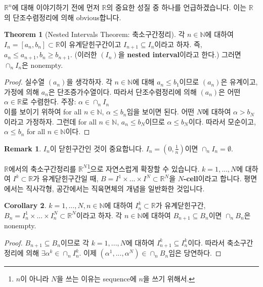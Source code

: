 \documentclass[12pt]{article}
\theoremstyle{definition}
\newtheorem{thm}{Theorem}[section]
\newtheorem{cor}[thm]{Corollary}
\newtheorem*{rem}{Remark}
\def\NN{\mathbb{N}}
\def\RR{\mathbb{R}}
\begin{document}
\(\RR^n\)에 대해 이야기하기 전에 먼저 \(\RR\)의 중요한 성질 중 하나를 언급하겠습니다. 이는 \(\RR\)의 단조수렴정리에 의해 obvious합니다.

	\begin{thm}[Nested Intervals Theorem: 축소구간정리]
		각 \(n \in \NN\)에 대하여 \(I_n = [a_n, b_n] \subset \RR\)이 유계닫힌구간이고 \(I_{n+1} \subseteq I_n\)이라고 하자. 즉, \(a_n \le a_{n+1}, b_n \ge b_{n+1}\). (이러한 \((I_n)\)을 \textbf{nested interval}이라고 한다.) 그러면 \(\cap_n I_n\)은 nonempty.
	\end{thm}
	\begin{proof}
		실수열 \((a_n)\)을 생각하자. 각 \(n \in \mathbb{N}\)에 대해 \(a_n \le b_1\)이므로 \((a_n)\)은 유계이고, 가정에 의해 \(a_n\)은 단조증가수열이다. 따라서 단조수렴정리에 의해 \((a_n)\)은 어떤 \(\alpha \in \RR\)로 수렴한다. 주장: \(\alpha \in \cap_n I_n\)\\
		이를 보이기 위하여 for all \(n \in \NN\), \(\alpha \le b_n\)임을 보이면 된다. 어떤 \(N\)에 대하여 \(\alpha > b_N\)이라고 가정하자. 그런데 for all \(n \in \NN\), \(a_n \le b_N\)이므로 \(\alpha \le b_N\)이다. 따라서 모순이고, \(\alpha \le b_n\) for all \(n \in \NN\)이다.
	\end{proof}

	\begin{rem}
		\(I_n\)이 닫힌구간인 것이 중요합니다. \(I_n = (0, \frac{1}{n})\)이면 \(\cap_n I_n = \emptyset \).
	\end{rem}

\(\RR\)에서의 축소구간정리를 \(\RR^N\)\footnote{\(n\)이 아니라 \(N\)을 쓰는 이유는 sequence에 \(n\)을 쓰기 위해서.}으로 자연스럽게 확장할 수 있습니다. \(k = 1, ..., N\)에 대하여 \(I^k \subset \RR\)가 유계닫힌구간일 때, \(B = I^1 \times ... \times I^N \subset \RR^N\)을 \textbf{\(N\)-cell}이라고 합니다. 평면에서는 직사각형, 공간에서는 직육면체의 개념을 일반화한 것입니다.

	\begin{cor} \label{cor Ncell}
		\(k = 1, ..., N, n \in \NN\)에 대하여 \(I_n^k \subset \RR\)가 유계닫힌구간, \(B_n = I_n^1 \times ... \times I_n^N \subset \RR^N\)이라고 하자. 각 \(n \in \NN\)에 대하여 \(B_{n+1} \subseteq B_n\)이면 \(\cap_n B_n\)은 nonempty.
	\end{cor}
	\begin{proof}
		\(B_{n+1} \subseteq B_n\)이므로 각 \(k = 1, ..., N\)에 대하여 \(I_{n+1}^k \subseteq I_n^k\)이다. 따라서 축소구간정리에 의해 \(\exists \alpha^k \in \cap_n I_n^k\). 이제 \((\alpha^1, ..., \alpha^N) \in \cap_n B_n\)임은 당연하다.
	\end{proof}
\end{document}
